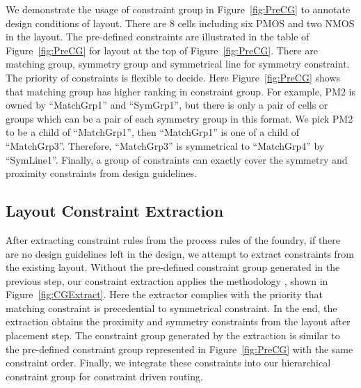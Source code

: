     
      We demonstrate the usage of constraint group in Figure~\ref{fig:PreCG} to annotate design conditions of layout. There are 8 cells including six PMOS and two NMOS in the layout. The pre-defined constraints are illustrated in the table of Figure~\ref{fig:PreCG} for layout at the top of Figure~\ref{fig:PreCG}. There are matching group, symmetry group and symmetrical line for symmetry constraint. The priority of constraints is flexible to decide. Here Figure~\ref{fig:PreCG} shows that matching group has higher ranking in constraint group. For example, PM2 is owned by ``MatchGrp1'' and ``SymGrp1'', but there is only a pair of cells or groups which can be a pair of each symmetry group in this format. We pick PM2 to be a child of  ``MatchGrp1'', then ``MatchGrp1'' is one of a child of ``MatchGrp3''. Therefore, ``MatchGrp3'' is symmetrical to ``MatchGrp4'' by ``SymLine1''. Finally, a group of constraints can exactly cover the symmetry and proximity constraints from design guidelines.


    \subsection{Layout Constraint Extraction}\label{sec:LayoutConExt}
      After extracting constraint rules from the process rules of the foundry, if there are no design guidelines left in the design, we attempt to extract constraints from the existing layout. Without the pre-defined constraint group generated in the previous step, our constraint extraction applies the methodology \cite{srm-massier-tcad08,palpndg-iccad2011}, shown in Figure~\ref{fig:CGExtract}. Here the extractor complies with the priority that matching constraint is precedential to symmetrical constraint. In the end, the extraction obtains the proximity and symmetry constraints from the layout after placement step. The constraint group generated by the extraction is similar to the pre-defined constraint group represented in Figure~\ref{fig:PreCG} with the same constraint order. Finally, we integrate these constraints into our hierarchical constraint group for constraint driven routing.
    
